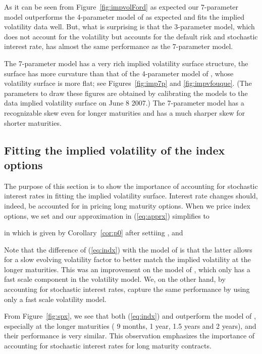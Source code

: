 \documentclass[11pt]{article}
\numberwithin{equation}{section}
\begin{document}
As it can be seen from Figure~\ref{fig:impvolFord} as expected our 7-parameter model outperforms the 
4-parameter model of \cite{ronnie-timescale} as expected and fits the implied volatility data well. But, what is surprising is that the 3-parameter model, which does not account for the volatility but accounts for the default risk and stochastic interest rate, has almost the same performance as the 7-parameter model.


The 7-parameter model has a very rich implied volatility surface structure, the surface has more curvature than that of the 4-parameter model of \cite{ronnie-timescale}, whose volatility  surface is more flat; see Figures~\ref{fig:imp7p} and \ref{fig:impvfouque}. (The parameters to draw these figures are obtained by calibrating the models to the data implied volatility surface on June 8 2007.)
The 7-parameter model has a recognizable skew even for longer maturities and has a much sharper skew for shorter maturities. 


\subsection{Fitting the implied volatility of the index options}\label{sec:demnst}
The purpose of this section is to show the importance of accounting for stochastic interest rates in fitting the implied volatility surface. Interest rate changes should, indeed, be accounted for in pricing long maturity options. When we price index options, we set  and our approximation in (\ref{eq:apprx})
simplifies to

in which 
 is given by Corollary~\ref{cor:p0} after settiing , and

Note that the difference of (\ref{eq:indx}) with the model of \cite{ronnie-timescale} is that the latter allows for a slow evolving volatility factor to better match the implied volatility at the longer maturities. This was an improvement on the model of \cite{sircar}, which only has a fast scale component in the volatility model.
We, on the other hand, by accounting for stochastic interest rates, capture the same performance by using only a fast scale volatility model.

From Figure~\ref{fig:spx}, we see that both (\ref{eq:indx}) and \cite{ronnie-timescale} outperform the model of \cite{sircar}, especially at the longer maturities ( 9 months, 1 year, 1.5 years and 2 years), and their performance is very similar. This observation emphasizes the importance of accounting for  stochastic interest rates for long maturity contracts. 
\end{document}
